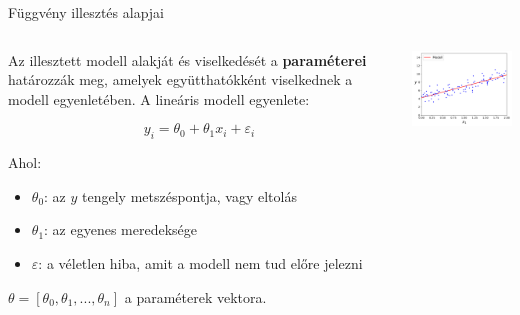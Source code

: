 \documentclass[english, aspectratio=169]{beamer}
\begin{document}
\begin{frame}{Függvény illesztés alapjai}
	\begin{columns}
		\begin{column}{.5\textwidth}
			Az illesztett modell alakját és viselkedését a \textbf{paraméterei} határozzák meg, amelyek együtthatókként viselkednek a modell egyenletében. A lineáris modell egyenlete: 
			\begin{block}{}
				\vspace{-0.25cm}
				\[
				y_i = \theta_0 + \theta_1x_i + \varepsilon_i
				\]
			\end{block}
			Ahol:
			\begin{itemize}
				\item $\theta_0$: az $y$ tengely metszéspontja, vagy eltolás
				\item $\theta_1$: az egyenes meredeksége
				\item $\varepsilon$: a véletlen hiba, amit a modell nem tud előre jelezni
			\end{itemize}
			$\theta=[\theta_0,\theta_1,...,\theta_n]$ a paraméterek vektora.
		\end{column}
		\begin{column}{.5\textwidth}
			\begin{center}
				\includegraphics[width=7cm, keepaspectratio]{images/ql_9.png}
			\end{center}
		\end{column}
	\end{columns}
\end{frame}
\end{document}
